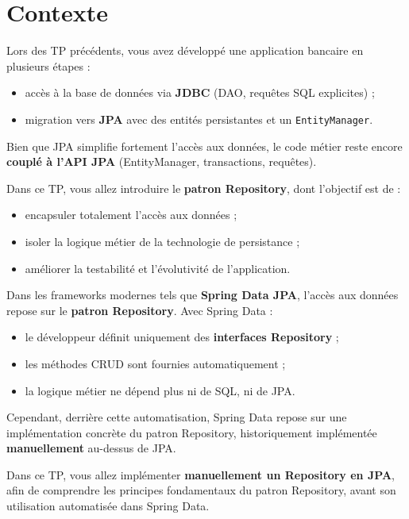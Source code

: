 \documentclass[11pt]{article}
\begin{document}
\section*{Contexte}

Lors des TP précédents, vous avez développé une application bancaire en plusieurs étapes :
\begin{itemize}
    \item accès à la base de données via \textbf{JDBC} (DAO, requêtes SQL explicites) ;
    \item migration vers \textbf{JPA} avec des entités persistantes et un \texttt{EntityManager}.
\end{itemize}

Bien que JPA simplifie fortement l’accès aux données, le code métier reste encore
\textbf{couplé à l’API JPA} (EntityManager, transactions, requêtes).

Dans ce TP, vous allez introduire le \textbf{patron Repository}, dont l’objectif est de :
\begin{itemize}
    \item encapsuler totalement l’accès aux données ;
    \item isoler la logique métier de la technologie de persistance ;
    \item améliorer la testabilité et l’évolutivité de l’application.
\end{itemize}

Dans les frameworks modernes tels que \textbf{Spring Data JPA}, l’accès aux données
repose sur le \textbf{patron Repository}.  Avec Spring Data :
\begin{itemize}
    \item le développeur définit uniquement des \textbf{interfaces Repository} ;
    \item les méthodes CRUD sont fournies automatiquement ;
    \item la logique métier ne dépend plus ni de SQL, ni de JPA.
\end{itemize}

Cependant, derrière cette automatisation, Spring Data repose sur une implémentation
concrète du patron Repository, historiquement implémentée \textbf{manuellement}
au-dessus de JPA.

Dans ce TP, vous allez implémenter \textbf{manuellement un Repository en JPA},
afin de comprendre les principes fondamentaux du patron Repository, avant son
utilisation automatisée dans Spring Data.
\end{document}
